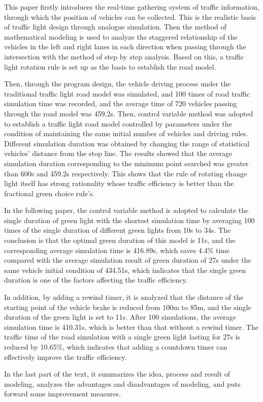 \documentclass[a4paper,12pt]{article}
\numberwithin{equation}{section}
\begin{document}
	\begin{spacing}{1.08}
		\fontsize{14pt}{16.8pt}\selectfont
This paper firstly introduces the real-time gathering system of traffic information, through which the position of vehicles can be collected. This is the realistic basis of traffic light design through analogue simulation. Then the method of mathematical modeling is used to analyze the staggered relationship of the vehicles in the left and right lanes in each direction when passing through the intersection with the method of step by step analysis. Based on this, a traffic light rotation rule is set up as the basis to establish the road model. \par

Then, through the program design, the vehicle driving process under the traditional traffic light road model was simulated, and 100 times of road traffic simulation time was recorded, and the average time of 720 vehicles passing through the road model was 459.2s. Then, control variable method was adopted to establish a traffic light road model controlled by parameters under the condition of maintaining the same initial number of vehicles and driving rules. Different simulation duration was obtained by changing the range of statistical vehicles' distance from the stop line. The results showed that the average simulation duration corresponding to the minimum point searched was greater than 600s and 459.2s respectively. This shows that the rule of rotating change light itself has strong rationality whose traffic efficiency is better than the fractional green choice rule's.\par

In the following paper, the control variable method is adopted to calculate the single duration of green light with the shortest simulation time by averaging 100 times of the single duration of different green lights from 10s to 34s. The conclusion is that the optimal green duration of this model is 11s, and the corresponding average simulation time is 416.89s, which saves 4.4\% time compared with the average simulation result of green duration of 27s under the same vehicle initial condition of 434.51s, which indicates that the single green duration is one of the factors affecting the traffic efficiency. \par

In addition, by adding a rewind timer, it is analyzed that the distance of the starting point of the vehicle brake is reduced from 100m to 85m, and the single duration of the green light is set to 11s. After 100 simulations, the average simulation time is 410.31s, which is better than that without a rewind timer. The traffic time of the road simulation with a single green light lasting for 27s is reduced by 10.65\%, which indicates that adding a countdown timer can effectively improve the traffic efficiency. \par

In the last part of the text, it summarizes the idea, process and result of modeling, analyzes the advantages and disadvantages of modeling, and puts forward some improvement measures.
\end{spacing}
\end{document}
